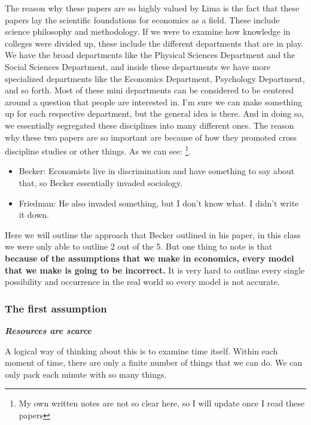 \documentclass{article}
\begin{document}
The reason why these papers are so highly valued by Lima is the fact that these papers lay the scientific foundations for economics as a field. These include science philosophy and methodology. If we were to examine how knowledge in colleges were divided up, these include the different departments that are in play. We have the broad departments like the Physical Sciences Department and the Social Sciences Department, and inside these departments we have more specialized departments like the Economics Department, Psychology Department, and so forth. Most of these mini departments can be considered to be centered around a question that people are interested in. I'm sure we can make something up for each respective department, but the general idea is there. And in doing so, we essentially segregated these disciplines into many different ones. The reason why these two papers are so important are because of how they promoted cross discipline studies or other things. As we can see: \footnote{My own written notes are not so clear here, so I will update once I read these papers}. 
\begin{itemize}
    \item Becker: Economists live in discrimination and have something to say about that, so Becker essentially invaded sociology. 
    \item Friedman: He also invaded something, but I don't know what. I didn't write it down.
\end{itemize}
Here we will outline the approach that Becker outlined in his paper, in this class we were only able to outline 2 out of the 5. But one thing to note is that \textbf{because of the assumptions that we make in economics, every model that we make is going to be incorrect.} It is very hard to outline every single possibility and occurrence in the real world so every model is not accurate.\\
\subsubsection{The first assumption}
\begin{center}
    \Large \textbf{\emph{Resources are scarce}}
\end{center}
A logical way of thinking about this is to examine time itself. Within each moment of time, there are only a finite number of things that we can do. We can only pack each minute with so many things. \\
\end{document}
